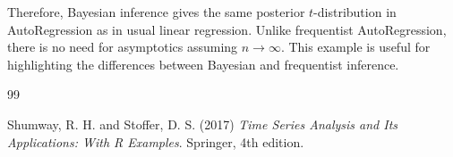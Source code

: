 \documentclass{scrartcl}
\begin{document}
Therefore, Bayesian inference gives the same posterior
$t$-distribution in AutoRegression as in usual linear
regression. Unlike frequentist AutoRegression, there is no need for
asymptotics assuming $n \rightarrow \infty$. This example is useful
for highlighting the differences between Bayesian and frequentist
inference. 




\begin{thebibliography}{99}


  


Shumway, R. H. and Stoffer, D. S. (2017)
\textit{Time Series Analysis and Its Applications: With R
  Examples}. Springer, 4th edition. 
  
 






\end{thebibliography}
\end{document}
